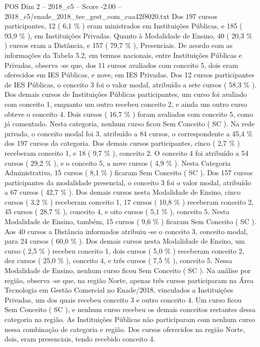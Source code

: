 \begin{textsample}{POS Dim 2 – 2018\_c5 – Score -2.00 – 2018\_c5/enade\_2018\_tec\_gest\_com\_caa42f8020.txt}
Dos 197 cursos participantes, 12 ( 6,1 \% ) eram ministrados em Instituições Públicas, e 185 ( 93,9 \% ), em Instituições Privadas.
Quanto à Modalidade de Ensino, 40 ( 20,3 \% ) cursos eram a Distância, e 157 ( 79,7 \% ), Presenciais.
De acordo com as informações da Tabela 5.2, em termos nacionais, entre Instituições Públicas e Privadas, observa -se que, dos 11 cursos avaliados com conceito 5, dois eram oferecidos em IES Públicas, e nove, em IES Privadas.
Dos 12 cursos participantes de IES Públicas, o conceito 3 foi o valor modal, atribuído a sete cursos ( 58,3 \% ).
Dos demais cursos de Instituições Públicas participantes, um curso foi avaliado com conceito 1, enquanto um outro recebeu conceito 2, e ainda um outro curso obteve o conceito 4.
Dois cursos ( 16,7 \% ) foram avaliados com conceito 5, como já comentado.
Nesta categoria, nenhum curso ficou Sem Conceito ( SC ).
Na rede privada, o conceito modal foi 3, atribuído a 84 cursos, o correspondente a 45,4 \% dos 197 cursos da categoria.
Dos demais cursos participantes, cinco ( 2,7 \% ) receberam conceito 1, e 18 ( 9,7 \% ), conceito 2.
O conceito 4 foi atribuído a 54 cursos ( 29,2 \% ), e o conceito 5, a nove cursos ( 4,9 \% ).
Nesta Categoria Administrativa, 15 cursos ( 8,1 \% ) ficaram Sem Conceito ( SC ).
Dos 157 cursos participantes da modalidade presencial, o conceito 3 foi o valor modal, atribuído a 67 cursos ( 42,7 \% ).
Dos demais cursos nesta Modalidade de Ensino, cinco cursos ( 3,2 \% ) receberam conceito 1, 17 cursos ( 10,8 \% ) receberam conceito 2, 45 cursos ( 28,7 \% ), conceito 4, e oito cursos ( 5,1 \% ), conceito 5.
Nesta Modalidade de Ensino, também, 15 cursos ( 9,6 \% ) ficaram Sem Conceito ( SC ).
Aos 40 cursos a Distância informados atribuiu -se o conceito 3, conceito modal, para 24 cursos ( 60,0 \% ).
Dos demais cursos nesta Modalidade de Ensino, um curso ( 2,5 \% ) recebeu conceito 1, dois cursos ( 5,0 \% ) receberam conceito 2, dez cursos ( 25,0 \% ), conceito 4, e três cursos ( 7,5 \% ), conceito 5.
Nessa Modalidade de Ensino, nenhum curso ficou Sem Conceito ( SC ).
Na análise por região, observa -se que, na região Norte, apenas três cursos participaram na Área Tecnologia em Gestão Comercial no Enade/2018, vinculados a Instituições Privadas, um dos quais recebeu conceito 3 e outro conceito 4.
Um curso ficou Sem Conceito ( SC ), e nenhum curso recebeu os demais conceitos restantes dessa categoria na região.
As Instituições Públicas não participaram com nenhum curso nessa combinação de categoria e região.
Dos cursos oferecidos na região Norte, dois, eram presenciais, tendo recebido conceito 4.

\end{textsample}
